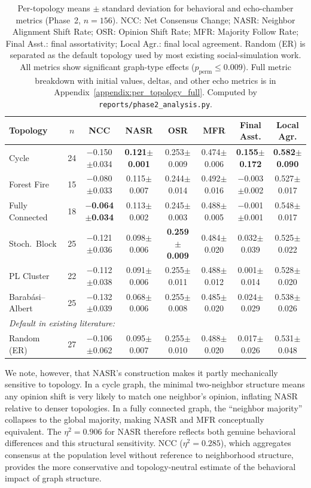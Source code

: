 \documentclass[11pt]{article}
\begin{document}
\begin{table}[t]
\centering
\small
\begin{tabular}{l c cccccc}
\toprule
Topology & $n$ & NCC & NASR & OSR & MFR & Final Asst. & Local Agr. \\
\midrule
Cycle            & 24 & $-$0.150$\pm$0.034 & \textbf{0.121$\pm$0.001} & 0.253$\pm$0.009 & 0.474$\pm$0.006 & \textbf{0.155$\pm$0.172} & \textbf{0.582$\pm$0.090} \\
Forest Fire      & 15 & $-$0.080$\pm$0.033 & 0.115$\pm$0.007 & 0.244$\pm$0.014 & 0.492$\pm$0.016 & $-$0.003$\pm$0.002 & 0.527$\pm$0.017 \\
Fully Connected  & 18 & \textbf{$-$0.064$\pm$0.034} & 0.113$\pm$0.002 & 0.245$\pm$0.003 & 0.488$\pm$0.005 & $-$0.001$\pm$0.001 & 0.548$\pm$0.017 \\
Stoch.\ Block    & 25 & $-$0.121$\pm$0.036 & 0.098$\pm$0.006 & \textbf{0.259$\pm$0.009} & 0.484$\pm$0.020 & 0.032$\pm$0.039 & 0.525$\pm$0.022 \\
PL Cluster       & 22 & $-$0.112$\pm$0.038 & 0.091$\pm$0.006 & 0.255$\pm$0.011 & 0.488$\pm$0.012 & 0.001$\pm$0.014 & 0.528$\pm$0.020 \\
Barab\'{a}si--Albert & 25 & $-$0.132$\pm$0.039 & 0.068$\pm$0.006 & 0.255$\pm$0.008 & 0.485$\pm$0.020 & 0.024$\pm$0.029 & 0.538$\pm$0.026 \\
\midrule
\multicolumn{8}{l}{\textit{Default in existing literature:}} \\
Random (ER)      & 27 & $-$0.106$\pm$0.062 & 0.095$\pm$0.007 & 0.255$\pm$0.010 & 0.488$\pm$0.020 & 0.017$\pm$0.026 & 0.531$\pm$0.048 \\
\bottomrule
\end{tabular}
\caption{Per-topology means $\pm$ standard deviation for behavioral and echo-chamber metrics (Phase~2, $n=156$). NCC: Net Consensus Change; NASR: Neighbor Alignment Shift Rate; OSR: Opinion Shift Rate; MFR: Majority Follow Rate; Final Asst.: final assortativity; Local Agr.: final local agreement. Random (ER) is separated as the default topology used by most existing social-simulation work. All metrics show significant graph-type effects ($p_{\text{perm}} \leq 0.009$). Full metric breakdown with initial values, deltas, and other echo metrics is in Appendix~\ref{appendix:per_topology_full}. Computed by \texttt{reports/phase2\_analysis.py}.}
\label{tab:topology_attribution}
\end{table}

We note, however, that NASR's construction makes it partly mechanically sensitive to topology. In a cycle graph, the minimal two-neighbor structure means any opinion shift is very likely to match one neighbor's opinion, inflating NASR relative to denser topologies. In a fully connected graph, the ``neighbor majority'' collapses to the global majority, making NASR and MFR conceptually equivalent. The $\eta^2 = 0.906$ for NASR therefore reflects both genuine behavioral differences and this structural sensitivity. NCC ($\eta^2 = 0.285$), which aggregates consensus at the population level without reference to neighborhood structure, provides the more conservative and topology-neutral estimate of the behavioral impact of graph structure.
\end{document}
